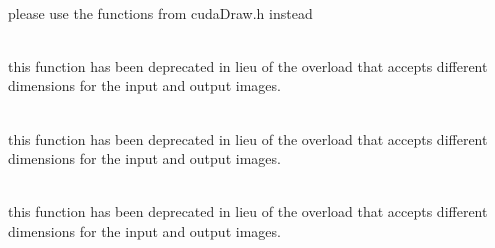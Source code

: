 \begin{DoxyRefList}
\item[{\parbox[t]{\linewidth}{Member \doxylink{group__overlay_ga852b6b1da9290729d7bbddf73553f824}{cuda\+Rect\+Fill} (T \texorpdfstring{$\ast$}{*}input, T \texorpdfstring{$\ast$}{*}output, size\+\_\+t width, size\+\_\+t height, float4 \texorpdfstring{$\ast$}{*}rects, int num\+Rects, const float4 \&color, cuda\+Stream\+\_\+t stream=0)}}]\hfill \\
\label{deprecated__deprecated000024}%
%
please use the functions from cuda\+Draw.\+h instead


\item[{\parbox[t]{\linewidth}{Member \doxylink{group__warping_ga9ae8f66a73e308ee12a26bb51c389ce7}{cuda\+Warp\+Perspective} (uchar4 \texorpdfstring{$\ast$}{*}input, uchar4 \texorpdfstring{$\ast$}{*}output, uint32\+\_\+t width, uint32\+\_\+t height, const float transform\+[3]\+\+[3]\+, bool transform\+\_\+inverted=false, cuda\+Stream\+\_\+t stream=0)}}]\hfill \\
\label{deprecated__deprecated000012}%
%
this function has been deprecated in lieu of the overload that accepts different dimensions for the input and output images.


\item[{\parbox[t]{\linewidth}{Member \doxylink{group__warping_ga71dd488c3ef4f7e0a0c67fd045de85bb}{cuda\+Warp\+Perspective} (float4 \texorpdfstring{$\ast$}{*}input, float4 \texorpdfstring{$\ast$}{*}output, uint32\+\_\+t width, uint32\+\_\+t height, const float transform\+[3]\+\+[3]\+, bool transform\+\_\+inverted=false, cuda\+Stream\+\_\+t stream=0)}}]\hfill \\
\label{deprecated__deprecated000013}%
%
this function has been deprecated in lieu of the overload that accepts different dimensions for the input and output images.


\item[{\parbox[t]{\linewidth}{Member \doxylink{group__warping_ga9ae8f66a73e308ee12a26bb51c389ce7}{cuda\+Warp\+Perspective} (uchar4 \texorpdfstring{$\ast$}{*}input, uchar4 \texorpdfstring{$\ast$}{*}output, uint32\+\_\+t width, uint32\+\_\+t height, const float transform\+[3]\+\+[3]\+, bool transform\+\_\+inverted=false, cuda\+Stream\+\_\+t stream=0)}}]\hfill \\
\label{deprecated__deprecated000025}%
%
this function has been deprecated in lieu of the overload that accepts different dimensions for the input and output images.



\end{DoxyRefList}
